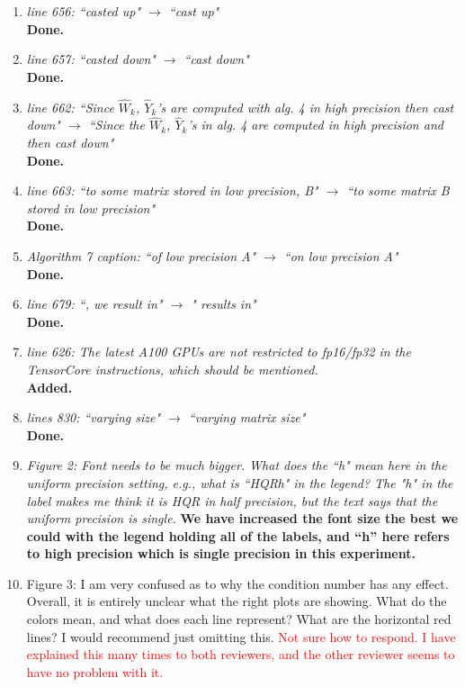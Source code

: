 \documentclass[final,onefignum,onetabnum]{siamart190516}
\newcommand{\red}[1]{\textcolor{red}{#1}}
\begin{document}
\begin{enumerate}
	\item {\it line 656: ``casted up" $\rightarrow$ ``cast up"}\\
	{\bf Done.}
	
	\item {\it line 657: ``casted down" $\rightarrow$ ``cast down"}\\
	{\bf Done.}
	
	\item {\it line 662: ``Since $\hat{W}_k$, $\hat{Y}_k$'s are computed with alg. 4 in high precision then cast down" $\rightarrow$ ``Since the $\hat{W}_k$, $\hat{Y}_k$'s in alg. 4 are computed in high precision and then cast down"}\\
	{\bf Done.}
	
	\item {\it line 663: ``to some matrix stored in low precision, B" $\rightarrow$ ``to some matrix B stored in low precision"}\\
	{\bf Done.}
	
	\item {\it Algorithm 7 caption: ``of low precision A" $\rightarrow$ ``on low precision A"}\\
	{\bf Done.}
	
	\item {\it line 679: ``, we result in" $\rightarrow$ " results in"}\\
	{\bf Done.}
	
	\item {\it line 626: The latest A100 GPUs are not restricted to fp16/fp32 in the TensorCore instructions, which should be mentioned.} \\
	{\bf Added.}
	
	\item {\it lines 830: ``varying size" $\rightarrow$ ``varying matrix size"}\\
	{\bf Done.}
	
	\item {\it Figure 2: Font needs to be much bigger. What does the ``h" mean here in the uniform precision setting, e.g., what is ``HQRh" in the legend? The "h" in the label makes me think it is HQR in half precision, but the text says that the uniform precision is single. }
	{\bf We have increased the font size the best we could with the legend holding all of the labels, and ``h'' here refers to high precision which is single precision in this experiment.}
	
	\item Figure 3: I am very confused as to why the condition number has any effect. Overall, it is entirely unclear what the right plots are showing. What do the colors mean, and what does each line represent? What are the horizontal red lines? I would recommend just omitting this. 
	\red{Not sure how to respond. I have explained this many times to both reviewers, and the other reviewer seems to have no problem with it.}
	
\end{enumerate}
\end{document}
